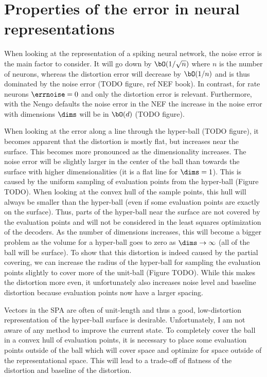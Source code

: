 \section{Properties of the error in neural representations}
When looking at the representation of a spiking neural network, the noise error is the main factor to consider.
It will go down by $\bO(1/\sqrt{n})$ where $n$ is the number of neurons, whereas the distortion error will decrease by $\bO(1/n)$ and is thus dominated by the noise error (TODO figure, ref NEF book).
In contrast, for rate neurons $\errnoise = 0$ and only the distortion error is relevant.
Furthermore, with the Nengo defaults the noise error in the NEF the increase in the noise error with dimensions $\dims$ will be in $\bO(d)$ (TODO figure).

When looking at the error along a line through the hyper-ball (TODO figure), it becomes apparent that the distortion is mostly flat, but increases near the surface.
This becomes more pronounced as the dimensionality increases.
The noise error will be slightly larger in the center of the ball than towards the surface with higher dimensionalities (it is a flat line for $\dims = 1$).
This is caused by the uniform sampling of evaluation points from the hyper-ball (Figure TODO).
When looking at the convex hull of the sample points, this hull will always be smaller than the hyper-ball (even if some evaluation points are exactly on the surface).
Thus, parts of the hyper-ball near the surface are not covered by the evaluation points and will not be considered in the least squares optimization of the decoders.
As the number of dimensions increases, this will become a bigger problem as the volume for a hyper-ball goes to zero as $\dims \rightarrow \infty$ (all of the ball will be surface).
To show that this distortion is indeed caused by the partial covering, we can increase the radius of the hyper-ball for sampling the evaluation points slightly to cover more of the unit-ball (Figure TODO).
While this makes the distortion more even, it unfortunately also increases noise level and baseline distortion because evaluation points now have a larger spacing.

Vectors in the SPA are often of unit-length and thus a good, low-distortion representation of the hyper-ball surface is desirable.
Unfortunately, I am not aware of any method to improve the current state.
To completely cover the ball in a convex hull of evaluation points, it is necessary to place some evaluation points outside of the ball which will cover space and optimize for space outside of the representational space.
This will lead to a trade-off of flatness of the distortion and baseline of the distortion.


